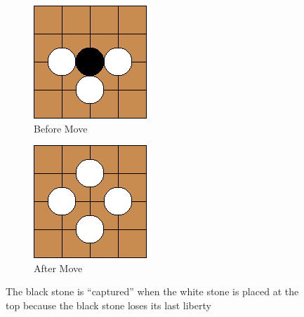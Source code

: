 \documentclass{l4proj}
\begin{document}
\begin{figure}[!ht]
\centering
\begin{subfigure}[b]{0.30\textwidth}
\includegraphics[width=\textwidth]{ex/Ex1-0.png}
\caption{Before Move}
\label{fig:ex1-0}
\end{subfigure} \qquad\qquad
\begin{subfigure}[b]{0.30\textwidth}
\includegraphics[width=\textwidth]{ex/Ex1-1.png}
\caption{After Move}
\label{fig:ex1-1}
\end{subfigure}
\caption{The black stone is “captured” when the white stone is placed at the top because the black stone loses its last liberty}
\label{fig:ex1}
\end{figure}
\end{document}

